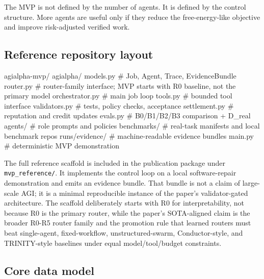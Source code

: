 \documentclass[
  11pt,
]{article}
\newenvironment{Shaded}{}{}
\newcommand{\NormalTok}[1]{#1}
\begin{document}
The MVP is not defined by the number of agents. It is defined by the
control structure. More agents are useful only if they reduce the
free-energy-like objective and improve risk-adjusted verified work.

\subsection{Reference repository
layout}\label{reference-repository-layout}

\begin{Shaded}
\begin{Highlighting}[]
\NormalTok{agialpha{-}mvp/}
\NormalTok{  agialpha/}
\NormalTok{    models.py          \# Job, Agent, Trace, EvidenceBundle}
\NormalTok{    router.py          \# router{-}family interface; MVP starts with R0 baseline, not the primary model}
\NormalTok{    orchestrator.py    \# main job loop}
\NormalTok{    tools.py           \# bounded tool interface}
\NormalTok{    validators.py      \# tests, policy checks, acceptance}
\NormalTok{    settlement.py      \# reputation and credit updates}
\NormalTok{    evals.py           \# B0/B1/B2/B3 comparison + D\_real}
\NormalTok{  agents/              \# role prompts and policies}
\NormalTok{  benchmarks/          \# real{-}task manifests and local benchmark repos}
\NormalTok{  runs/evidence/       \# machine{-}readable evidence bundles}
\NormalTok{  main.py              \# deterministic MVP demonstration}
\end{Highlighting}
\end{Shaded}

The full reference scaffold is included in the publication package under
\texttt{mvp\_reference/}. It implements the control loop on a local
software-repair demonstration and emits an evidence bundle. That bundle
is not a claim of large-scale AGI; it is a minimal reproducible instance
of the paper's validator-gated architecture. The scaffold deliberately
starts with R0 for interpretability, not because R0 is the primary
router, while the paper's SOTA-aligned claim is the broader R0-R5 router
family and the promotion rule that learned routers must beat
single-agent, fixed-workflow, unstructured-swarm, Conductor-style, and
TRINITY-style baselines under equal model/tool/budget constraints.

\subsection{Core data model}\label{core-data-model}
\end{document}
